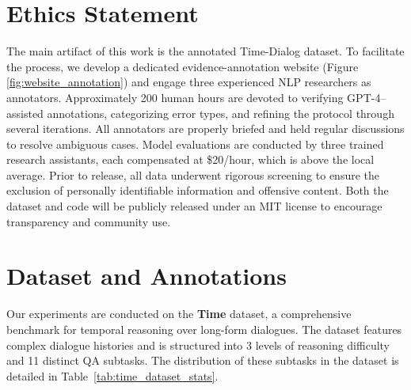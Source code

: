 \documentclass{article} %
\begin{document}
\section*{Ethics Statement}
The main artifact of this work is the annotated Time-Dialog dataset. To facilitate the process, we develop a dedicated evidence-annotation website (Figure \ref{fig:website_annotation}) and engage three experienced NLP researchers as annotators. Approximately 200 human hours are devoted to verifying GPT-4–assisted annotations, categorizing error types, and refining the protocol through several iterations. All annotators are properly briefed and held regular discussions to resolve ambiguous cases. Model evaluations are conducted by three trained research assistants, each compensated at \$20/hour, which is above the local average. Prior to release, all data underwent rigorous screening to ensure the exclusion of personally identifiable information and offensive content. Both the dataset and code will be publicly released under an MIT license to encourage transparency and community use.





\newpage

\appendix

\section{Dataset and Annotations}
\label{app:dataset_annotation}
Our experiments are conducted on the \textbf{Time} dataset, a comprehensive benchmark for temporal reasoning over long-form dialogues. The dataset features complex dialogue histories and is structured into 3 levels of reasoning difficulty and 11 distinct QA subtasks. The distribution of these subtasks in the dataset is detailed in Table~\ref{tab:time_dataset_stats}.
\end{document}
